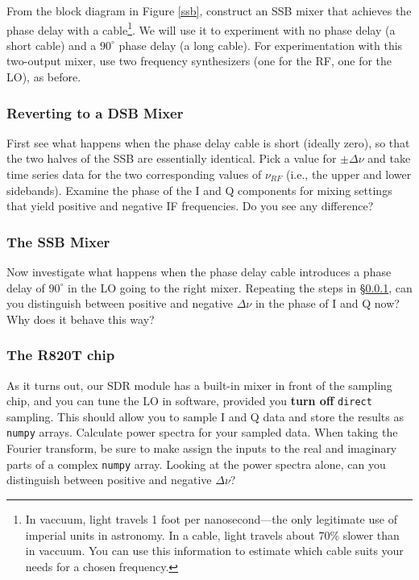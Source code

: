 \documentclass[11pt,preprint]{aastex}
\begin{document}
From the block diagram in Figure \ref{ssb}, construct an SSB mixer that
achieves the phase delay with a cable\footnote{In vaccuum, light travels
1 foot per nanosecond---the only legitimate use of
imperial units in astronomy. In a cable, light travels about
70\% slower than in vaccuum. You can use this information
to estimate which cable suits your
needs for a chosen frequency.}. We will use
it to experiment with no phase delay (a short cable) and a $90^\circ$
phase delay (a long cable).  For experimentation with this two-output
mixer, use two frequency synthesizers (one for the RF, one for the LO), as before.

\subsubsection{Reverting to a DSB Mixer} \label{dsbmixer}

\noindent
First see what happens when the phase delay cable is short (ideally
zero), so that the two halves of the SSB are essentially identical.
Pick a value for $\pm\Delta\nu$ and take time
series data for the two corresponding values of $\nu_{RF}$ (i.e., the
upper and lower sidebands). Examine the phase of the I and Q components
for mixing settings that yield positive and negative IF
frequencies. Do you see any difference?

\subsubsection{The SSB Mixer}

\noindent
Now investigate what happens when the phase delay cable introduces a 
phase delay of $90^\circ$ in the LO going to the right mixer.
Repeating the steps in \S \ref{dsbmixer},
can you distinguish between positive and negative
$\Delta\nu$ in the phase of I and Q now?
Why does it behave this way?

\subsubsection{The R820T chip}

As it turns out, our SDR module has a built-in mixer in front
of the sampling chip, and you can tune the LO in software,
provided you {\bf turn off} {\tt direct} sampling.
This should allow you to sample I and Q data and store the
results as {\tt numpy} arrays.
Calculate power spectra for your sampled data. When taking the
Fourier transform, be sure to make assign the inputs to the real and imaginary
parts of a complex {\tt numpy} array.
Looking at the power spectra alone, can you distinguish between positive and negative $\Delta
\nu$?
\end{document}
